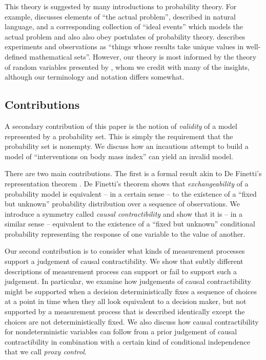 \documentclass{article}
\theoremstyle{plain}
\theoremstyle{definition}
\begin{document}
This theory is suggested by many introductions to probability theory. For example, \citet{boole_theory_1862} discusses elements of ``the actual problem'', described in natural language, and a corresponding collection of ``ideal events'' which models the actual problem and also also obey postulates of probability theory. \citet{feller_introduction_1968} describes experiments and observations as ``things whose results take unique values in well-defined mathematical sets''. However, our theory is most informed by the theory of random variables presented by \citet{menger_random_2003}, whom we credit with many of the insights, although our terminology and notation differs somewhat.

\subsection{Contributions}

A secondary contribution of this paper is the notion of \emph{validity} of a model represented by a probability set. This is simply the requirement that the probability set is nonempty.  We discuss how an incautious attempt to build a model of ``interventions on body mass index'' can yield an invalid model.

There are two main contributions. The first is a formal result akin to De Finetti's representation theorem \citep{de_finetti_foresight_1992}. De Finetti's theorem shows that \emph{exchangeability} of a probability model is equivalent -- in a certain sense -- to the existence of a ``fixed but unknown'' probability distribution over a sequence of observations. We introduce a symmetry called \emph{causal contractibility} and show that it is -- in a similar sense -- equivalent to the existence of a ``fixed but unknown'' conditional probability representing the response of one variable to the value of another.


Our second contribution is to consider what kinds of measurement processes support a judgement of causal contractibility. We show that subtly different descriptions of measurement process can support or fail to support such a judgement. In particular, we examine how judgements of causal contractibility might be supported when a decision deterministically fixes a sequence of choices at a point in time when they all look equivalent to a decision maker, but not supported by a measurement process that is described identically except the choices are not deterministically fixed. We also discuss how causal contractibility for nondeterministic variables can follow from a prior judgement of causal contractibility in combination with a certain kind of conditional independence that we call \emph{proxy control}.
\end{document}
